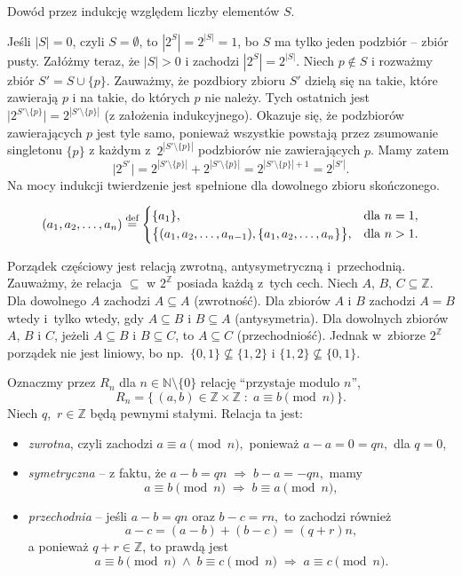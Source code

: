 \exercise %
Dowód przez indukcję względem liczby elementów $S$.

Jeśli $|S|=0$, czyli $S=\emptyset$, to $|2^S|=2^{|S|}=1$, bo $S$ ma tylko jeden podzbiór -- zbiór pusty. Załóżmy teraz, że $|S|>0$ i zachodzi $|2^S|=2^{|S|}$. Niech $p\not\in S$ i rozważmy zbiór $S'=S\cup\{p\}$. Zauważmy, że pozdbiory zbioru $S'$ dzielą się na takie, które zawierają $p$ i na takie, do których $p$ nie należy. Tych ostatnich jest $\bigl|2^{S'\setminus\{p\}}\bigr|=2^{\left|S'\setminus\{p\}\right|}$ (z założenia indukcyjnego). Okazuje się, że podzbiorów zawierających $p$ jest tyle samo, ponieważ wszystkie powstają przez zsumowanie singletonu $\{p\}$ z każdym z~$2^{\left|S'\setminus\{p\}\right|}$ podzbiorów nie zawierających $p$. Mamy zatem
\[
	\bigl|2^{S'}\bigr|=2^{\left|S'\setminus\{p\}\right|}+2^{\left|S'\setminus\{p\}\right|} = 2^{\left|S'\setminus\{p\}\right|+1} = 2^{|S'|}.
\]
Na mocy indukcji twierdzenie jest spełnione dla dowolnego zbioru skończonego.

\exercise %
\[
	(a_1,a_2,\dots,a_n)\stackrel{\text{\scriptsize def}}{=}
	\begin{cases}
		\{a_1\}, & \text{dla $n=1$}, \\
		\bigl\{(a_1,a_2,\dots,a_{n-1}),\{a_1,a_2,\dots,a_n\}\bigr\}, & \text{dla $n>1$}.
	\end{cases}
\]


\exercise %
Porządek częściowy jest relacją zwrotną, antysymetryczną i~przechodnią. Zauważmy, że relacja $\subseteq$ w $2^\mathbb{Z}$ posiada każdą z~tych cech. Niech $A$, $B$, $C\subseteq\mathbb{Z}$. Dla dowolnego $A$ zachodzi $A\subseteq A$ (zwrotność). Dla zbiorów $A$ i $B$ zachodzi $A=B$ wtedy i~tylko wtedy, gdy $A\subseteq B$ i $B\subseteq A$ (antysymetria). Dla dowolnych zbiorów $A$, $B$ i $C$, jeżeli $A\subseteq B$ i $B\subseteq C$, to $A\subseteq C$ (przechodniość). Jednak w~zbiorze $2^\mathbb{Z}$ porządek nie jest liniowy, bo np.\ $\{0,1\}\not\subseteq\{1,2\}$ i $\{1,2\}\not\subseteq\{0,1\}$.

\exercise %
Oznaczmy przez $R_n$ dla $n\in\mathbb{N}\setminus\{0\}$ relację ``przystaje modulo $n$'',
\[
	R_n = \bigl\{\,(a,b)\in\mathbb{Z}\times\mathbb{Z}\;:\;a\equiv b\!\!\!\pmod{n}\,\bigr\}.
\]
Niech $q$,~$r\in\mathbb{Z}$ będą pewnymi stałymi. Relacja ta jest:
\begin{itemize}
	\item \emph{zwrotna}, czyli zachodzi $a\equiv a\pmod{n},$ ponieważ $a-a=0=qn,$ dla $q=0$,
	\item \emph{symetryczna} -- z faktu, że $a-b=qn\;\Rightarrow\;b-a=-qn,$ mamy
	\[
		a\equiv b\!\!\!\pmod{n}\;\Rightarrow\;b\equiv a\!\!\!\pmod{n},
	\]
	\item \emph{przechodnia} -- jeśli $a-b=qn$ oraz $b-c=rn,$ to zachodzi również
	\[
		a-c=(a-b)+(b-c)=(q+r)n,
	\]
	a ponieważ $q+r\in\mathbb{Z}$, to prawdą jest
	\[
		a\equiv b\!\!\!\pmod{n}\;\wedge\;b\equiv c\!\!\!\pmod{n}\;\Rightarrow\;a\equiv c\!\!\!\pmod{n}.
	\]
\end{itemize}

